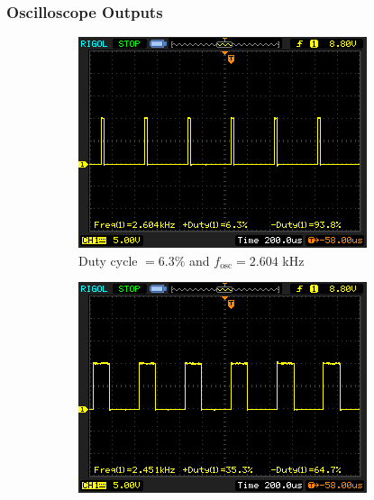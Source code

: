 \begin{enumerate}
\begin{enumerate}
        \subsubsection*{Oscilloscope Outputs}

        \begin{figure}[H]
            \centering
            \begin{subfigure}[b]{0.4\textwidth}
                \centering
                \includegraphics[width=\textwidth]{images/astable31.png}
                \caption{Duty cycle $= 6.3\%$ and $f_\text{osc}=2.604$ kHz}
            \end{subfigure}
            \hfill
            \begin{subfigure}[b]{0.4\textwidth}
                \centering
                \includegraphics[width=\textwidth]{images/astable32.png}

\end{subfigure}
\end{figure}
\end{enumerate}
\end{enumerate}
